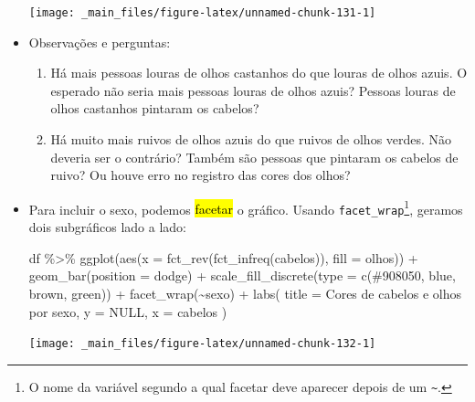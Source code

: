 \documentclass[
  11pt]{report}
\newenvironment{Shaded}{\begin{snugshade}}{\end{snugshade}}
\newcommand{\AttributeTok}[1]{\textcolor[rgb]{0.77,0.63,0.00}{#1}}
\newcommand{\ConstantTok}[1]{\textcolor[rgb]{0.00,0.00,0.00}{#1}}
\newcommand{\FunctionTok}[1]{\textcolor[rgb]{0.00,0.00,0.00}{#1}}
\newcommand{\NormalTok}[1]{#1}
\newcommand{\SpecialCharTok}[1]{\textcolor[rgb]{0.00,0.00,0.00}{#1}}
\newcommand{\StringTok}[1]{\textcolor[rgb]{0.31,0.60,0.02}{#1}}
\renewenvironment{Shaded}{
    \begin{mdframed}[%
      roundcorner=2pt,%
      innerleftmargin=5pt,%
      innerrightmargin=5pt,%
      topline=true,%
      leftline=true,%
      rightline=true,%
      bottomline=true,%
      linewidth=0.5pt,%
      linecolor=black!20,%
      backgroundcolor=black!2,%
      skipabove=2ex,%
      skipbelow=2.5ex%
    ]%
  }
  {
    \end{mdframed}
  }
\begin{document}
\begin{itemize}
  \begin{center}\texttt{[image: \_main\_files/figure-latex/unnamed-chunk-131-1]} \end{center}
\item
  Observações e perguntas:

  \begin{enumerate}
  \def\labelenumi{\arabic{enumi}.}
  \item
    Há mais pessoas louras de olhos castanhos do que louras de olhos azuis. O esperado não seria mais pessoas louras de olhos azuis? Pessoas louras de olhos castanhos pintaram os cabelos?
  \item
    Há muito mais ruivos de olhos azuis do que ruivos de olhos verdes. Não deveria ser o contrário? Também são pessoas que pintaram os cabelos de ruivo? Ou houve erro no registro das cores dos olhos?
  \end{enumerate}
\item
  Para incluir o sexo, podemos {\hl{facetar}} o gráfico. Usando \texttt{facet\_wrap}\footnote{O nome da variável segundo a qual facetar deve aparecer depois de um \texttt{\textasciitilde{}}.}, geramos dois subgráficos lado a lado:

\begin{Shaded}
\begin{Highlighting}[]
\NormalTok{df }\SpecialCharTok{\%\textgreater{}\%} 
  \FunctionTok{ggplot}\NormalTok{(}\FunctionTok{aes}\NormalTok{(}\AttributeTok{x =} \FunctionTok{fct\_rev}\NormalTok{(}\FunctionTok{fct\_infreq}\NormalTok{(cabelos)), }\AttributeTok{fill =}\NormalTok{ olhos)) }\SpecialCharTok{+}
    \FunctionTok{geom\_bar}\NormalTok{(}\AttributeTok{position =} \StringTok{\textquotesingle{}dodge\textquotesingle{}}\NormalTok{) }\SpecialCharTok{+}
    \FunctionTok{scale\_fill\_discrete}\NormalTok{(}\AttributeTok{type =} \FunctionTok{c}\NormalTok{(}\StringTok{\textquotesingle{}\#908050\textquotesingle{}}\NormalTok{, }\StringTok{\textquotesingle{}blue\textquotesingle{}}\NormalTok{, }\StringTok{\textquotesingle{}brown\textquotesingle{}}\NormalTok{, }\StringTok{\textquotesingle{}green\textquotesingle{}}\NormalTok{)) }\SpecialCharTok{+}
    \FunctionTok{facet\_wrap}\NormalTok{(}\SpecialCharTok{\textasciitilde{}}\NormalTok{sexo) }\SpecialCharTok{+}
    \FunctionTok{labs}\NormalTok{(}
      \AttributeTok{title =} \StringTok{\textquotesingle{}Cores de cabelos e olhos por sexo\textquotesingle{}}\NormalTok{,}
      \AttributeTok{y =} \ConstantTok{NULL}\NormalTok{,}
      \AttributeTok{x =} \StringTok{\textquotesingle{}cabelos\textquotesingle{}}
\NormalTok{    )}
\end{Highlighting}
\end{Shaded}

  \begin{center}\texttt{[image: \_main\_files/figure-latex/unnamed-chunk-132-1]} \end{center}
\end{itemize}
\end{document}
